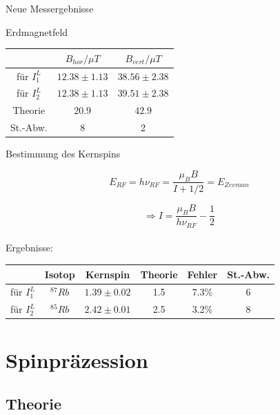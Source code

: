 \documentclass{beamer}
\begin{document}
\begin{frame}{Neue Messergebnisse}
\begin{exampleblock}{Erdmagnetfeld}
\begin{center}
\begin{tabular}[H]{c c c}
			& $B_{hor}/\mu T$	& $B_{vert}/\mu T$ \\ \hline
für $I_1^L$	& $12.38 \pm 1.13$ 	& $38.56 \pm 2.38$\\
für $I_2^L$	& $12.38 \pm 1.13$ 	& $39.51 \pm 2.38$\\
Theorie 		& $20.9$ 			& $42.9$\\
St.-Abw. 		& 8				& 2\\
\end{tabular}
\end{center}
\end{exampleblock}
\end{frame}

\begin{frame}{Bestimmung des Kernspins}

$$E_{RF} = h\nu_{RF} = \frac{\mu_BB}{I+1/2} = E_{Zeeman}$$

$$\Rightarrow I = \frac{\mu_BB}{h\nu_{RF}}-\frac{1}{2} $$\\



Ergebnisse:\\

\begin{tabular}{| c c c c c c |} \hline
			& Isotop		& Kernspin	& Theorie	&	Fehler	& St.-Abw.\\ \hline
für $I_1^L$	& $^{87}Rb$	& $1.39\pm0.02$&	1.5	&	7.3\%	& 6\\
für $I_2^L$	& $^{85}Rb$	& $2.42\pm0.01$ &	2.5	&	3.2\%	& 8\\ \hline
\end{tabular}
\end{frame}

\section{Spinpräzession}
\begin{frame}
\begin{center}
\end{center}
\end{frame}

\subsection{Theorie}
\end{document}
